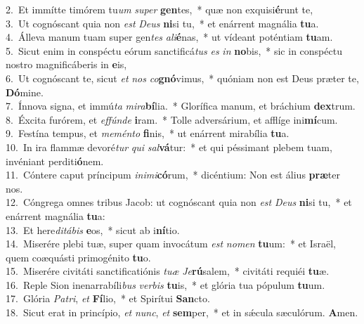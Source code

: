 {2.~}Et immítte timórem tu\textit{um} \textit{su}\textit{per} \textbf{gen}tes,~* quæ non exquisi\textbf{é}runt te,\\
{3.~}Ut cognóscant quia non \textit{est} \textit{De}\textit{us} \textbf{ni}si tu,~* et enárrent magnália \textbf{tu}a.\\
{4.~}Álleva manum tuam super gen\textit{tes} \textit{a}\textit{li}\textbf{é}nas,~* ut vídeant poténtiam \textbf{tu}am.\\
{5.~}Sicut enim in conspéctu eórum sanctificá\textit{tus} \textit{es} \textit{in} \textbf{no}bis,~* sic in conspéctu nostro magnificáberis in \textbf{e}is,\\
{6.~}Ut cognóscant te, sicut \textit{et} \textit{nos} \textit{co}\textbf{gnó}vimus,~* quóniam non est Deus præter te, \textbf{Dó}mine.\\
{7.~}Ínnova signa, et immú\textit{ta} \textit{mi}\textit{ra}\textbf{bí}lia.~* Glorífica manum, et bráchium \textbf{dex}trum.\\
{8.~}Éxcita furórem, et \textit{ef}\textit{fún}\textit{de} \textbf{i}ram.~* Tolle adversárium, et afflíge ini\textbf{mí}cum.\\
{9.~}Festína tempus, et \textit{me}\textit{mén}\textit{to} \textbf{fi}nis,~* ut enárrent mirabília \textbf{tu}a.\\
{10.~}In ira flammæ devoré\textit{tur} \textit{qui} \textit{sal}\textbf{vá}tur:~* et qui péssimant plebem tuam, invéniant perditi\textbf{ó}nem.\\
{11.~}Cóntere caput príncipum \textit{i}\textit{ni}\textit{mi}\textbf{có}rum,~* dicéntium: Non est álius \textbf{præ}ter nos.\\
{12.~}Cóngrega omnes tribus Jacob: ut cognóscant quia non \textit{est} \textit{De}\textit{us} \textbf{ni}si tu,~* et enárrent magnália \textbf{tu}a:\\
{13.~}Et here\textit{di}\textit{tá}\textit{bis} \textbf{e}os,~* sicut ab i\textbf{ní}tio.\\
{14.~}Miserére plebi tuæ, super quam invocátum \textit{est} \textit{no}\textit{men} \textbf{tu}um:~* et Israël, quem coæquásti primogénito \textbf{tu}o.\\
{15.~}Miserére civitáti sanctificatiónis \textit{tu}\textit{æ} \textit{Je}\textbf{rú}salem,~* civitáti requiéi \textbf{tu}æ.\\
{16.~}Reple Sion inenarrabíli\textit{bus} \textit{ver}\textit{bis} \textbf{tu}is,~* et glória tua pópulum \textbf{tu}um.\\
{17.~}Glória \textit{Pa}\textit{tri}, \textit{et} \textbf{Fí}lio,~* et Spirítui \textbf{San}cto.\\
{18.~}Sicut erat in princípio, \textit{et} \textit{nunc}, \textit{et} \textbf{sem}per,~* et in sǽcula sæculórum. \textbf{A}men.\\
